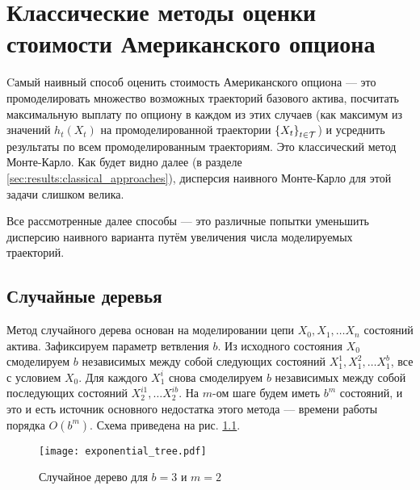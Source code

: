 \chapter{Классические методы оценки стоимости Американского опциона} %
\label{cha:classic_approaches_to_option_pricing}

Cамый наивный способ оценить стоимость Американского опциона --- это промоделировать множество возможных траекторий базового актива, посчитать максимальную выплату по опциону в каждом из этих случаев (как максимум из значений $h_t(X_t)$ на промоделированной траектории $\left\{ X_t \right\}_{t \in \mathcal{T}}$) и усреднить результаты по всем промоделированным траекториям. Это классический метод Монте-Карло. Как будет видно далее (в разделе \ref{sec:results:classical_approaches}), дисперсия наивного Монте-Карло для этой задачи слишком велика.

Все рассмотренные далее способы --- это различные попытки уменьшить дисперсию наивного варианта путём увеличения числа моделируемых траекторий. 

\section{Случайные деревья} %
\label{sec:classic_approaches:tree_estimator}

Метод случайного дерева основан на моделировании цепи $X_0, X_1, \ldots X_n$ состояний актива. Зафиксируем параметр ветвления $b$. Из исходного состояния $X_0$ смоделируем $b$ независимых между собой следующих состояний $X_1^1, X_1^2, \ldots X_1^b$, все с условием $X_0$. Для каждого $X_1^i$ снова смоделируем $b$ независимых между собой последующих состояний $X_2^{i1}, \ldots X_2^{ib}$. На $m$-ом шаге будем иметь $b^m$ состояний, и это и есть источник основного недостатка этого метода --- времени работы порядка $O(b^m)$. Схема приведена на рис. \ref{fig:exponential_tree}.
\begin{figure}[b]
    \centering
    \texttt{[image: exponential\_tree.pdf]}
    \caption{Случайное дерево для $b = 3$ и $m = 2$}
    \label{fig:exponential_tree}
\end{figure}

